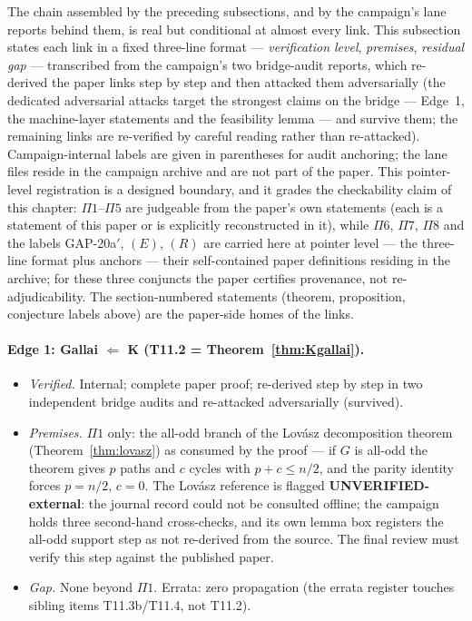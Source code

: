 The chain assembled by the preceding subsections, and by the campaign's lane reports behind
them, is real but conditional at almost every link. This subsection states each link in a
fixed three-line format --- \emph{verification level}, \emph{premises}, \emph{residual gap}
--- transcribed from the campaign's two bridge-audit reports, which re-derived the paper links
step by step and then attacked them adversarially (the dedicated adversarial attacks target the
strongest claims on the bridge --- Edge~1, the machine-layer statements and the feasibility
lemma --- and survive them; the remaining links are re-verified by careful reading rather than
re-attacked). Campaign-internal labels are given in parentheses for audit anchoring; the lane files
reside in the campaign archive and are not part of the paper. This pointer-level registration is a
designed boundary, and it grades the checkability claim of this chapter: $\Pi1$--$\Pi5$ are
judgeable from the paper's own statements (each is a statement of this paper or is explicitly
reconstructed in it), while $\Pi6$, $\Pi7$, $\Pi8$ and the labels GAP-20a$'$, $(E)$, $(R)$ are
carried here at pointer level --- the three-line format plus anchors --- their self-contained paper
definitions residing in the archive; for these three conjuncts the paper certifies provenance, not
re-adjudicability. The section-numbered statements
(theorem, proposition, conjecture labels above) are the paper-side homes of the links.

\paragraph{Edge 1: Gallai $\Leftarrow$ K (T11.2 = Theorem~\ref{thm:Kgallai}).}
\begin{itemize}[leftmargin=2em,itemsep=0.1em]
\item \emph{Verified.} Internal; complete paper proof; re-derived step by step in two
independent bridge audits and re-attacked adversarially (survived).
\item \emph{Premises.} $\Pi1$ only: the all-odd branch of the Lov\'asz decomposition theorem
(Theorem~\ref{thm:lovasz}) as consumed by the proof --- if $G$ is all-odd the theorem gives
$p$ paths and $c$ cycles with $p+c\le n/2$, and the parity identity forces $p=n/2$, $c=0$.
The Lov\'asz reference is flagged \textbf{UNVERIFIED-external}: the journal record could not
be consulted offline; the campaign holds three second-hand cross-checks, and its own lemma
box registers the all-odd support step as not re-derived from the source. The final review
must verify this step against the published paper.
\item \emph{Gap.} None beyond $\Pi1$. Errata: zero propagation (the errata register touches
sibling items T11.3b/T11.4, not T11.2).
\end{itemize}

